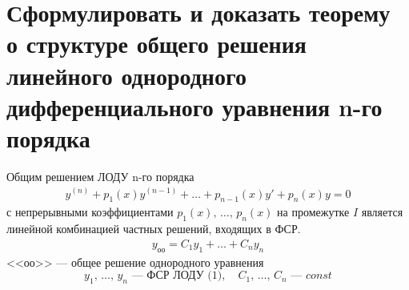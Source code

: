 \section{Сформулировать и доказать теорему о структуре общего решения линейного однородного дифференциального уравнения n-го порядка}

\begin{theorem}
    Общим решением ЛОДУ n-го порядка
    \begin{align*}
        y^{(n)} + p_1(x)y^{(n-1)} + \ldots + p_{n-1}(x) y' + p_n(x) y = 0 \tag{1}
    \end{align*}
    с непрерывными коэффициентами $p_1(x),\, \ldots,\, p_n(x)$ на промежутке $I$ является линейной комбинацией частных решений, входящих в ФСР.
    \begin{align*}
        y_{\text{оо}} = C_1y_1 + \ldots + C_ny_n \tag{2}
    \end{align*}
    <<оо>> --- общее решение однородного уравнения
    \[
        y_1,\, \ldots,\, y_n \text{ --- ФСР ЛОДУ (1)},\quad C_1,\, \ldots,\, C_n \text{ --- } const
    \]
\end{theorem}
